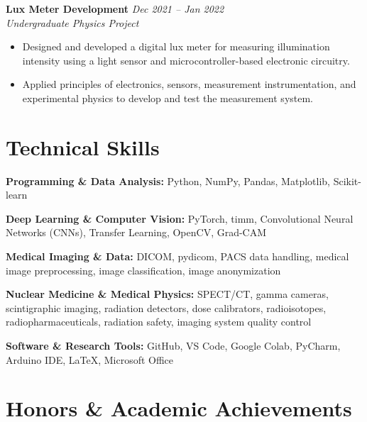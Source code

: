 \documentclass[10.5pt,a4paper]{article}
\begin{document}
\textbf{Lux Meter Development}
\hfill \textit{Dec 2021 -- Jan 2022}\\
\textit{Undergraduate Physics Project}

\begin{itemize}

    \item Designed and developed a digital lux meter for measuring
    illumination intensity using a light sensor and microcontroller-based
    electronic circuitry.

    \item Applied principles of electronics, sensors, measurement
    instrumentation, and experimental physics to develop and test the
    measurement system.

\end{itemize}



\section{Technical Skills}

\textbf{Programming \& Data Analysis:}
Python, NumPy, Pandas, Matplotlib, Scikit-learn

\textbf{Deep Learning \& Computer Vision:}
PyTorch, timm, Convolutional Neural Networks (CNNs),
Transfer Learning, OpenCV, Grad-CAM

\textbf{Medical Imaging \& Data:}
DICOM, pydicom, PACS data handling, medical image preprocessing,
image classification, image anonymization

\textbf{Nuclear Medicine \& Medical Physics:}
SPECT/CT, gamma cameras, scintigraphic imaging, radiation detectors,
dose calibrators, radioisotopes, radiopharmaceuticals, radiation safety,
imaging system quality control

\textbf{Software \& Research Tools:}
GitHub, VS Code, Google Colab, PyCharm, Arduino IDE, LaTeX,
Microsoft Office



\section{Honors \& Academic Achievements}
\end{document}
